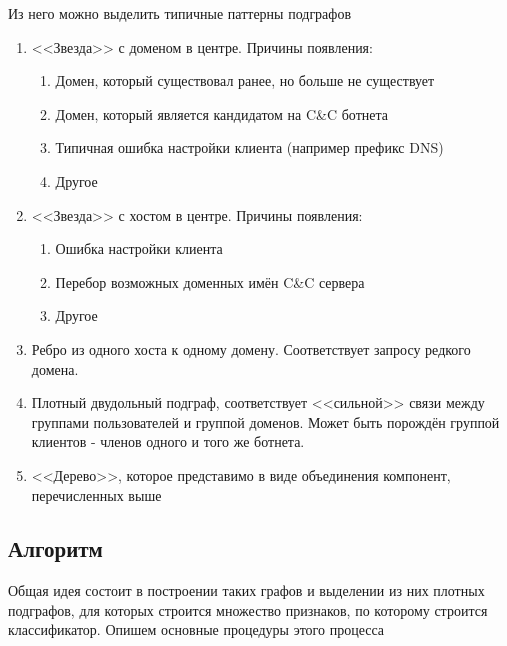 \documentclass[14pt]{extreport} %
\begin{document}
	
Из него можно выделить типичные паттерны подграфов
\begin{enumerate}
	\item <<Звезда>> с доменом в центре. Причины появления:
	      \begin{enumerate}
	      	\item Домен, который существовал ранее, но больше не существует
	      	\item Домен, который является кандидатом на C\&C ботнета
	      	\item Типичная ошибка настройки клиента (например префикс DNS)
	      	\item Другое
	      \end{enumerate}
	\item <<Звезда>> с хостом в центре. Причины появления:
	      \begin{enumerate}
	      	\item Ошибка настройки клиента
	      	\item Перебор возможных доменных имён C\&C сервера
	      	\item Другое
	      \end{enumerate}
	      	      	
	\item Ребро из одного хоста к одному домену. Соответствует запросу редкого домена.
	      	      	
	\item Плотный двудольный подграф, соответствует <<сильной>> связи между группами пользователей и группой доменов. Может быть порождён группой клиентов - членов одного и того же ботнета.
	      	      	
	\item <<Дерево>>, которое представимо в виде объединения компонент, перечисленных выше
\end{enumerate}
	
\subsection{Алгоритм}
Общая идея состоит в построении таких графов и выделении из них плотных подграфов, для которых строится множество признаков, по которому строится классификатор. Опишем основные процедуры этого процесса
	
\end{document}
